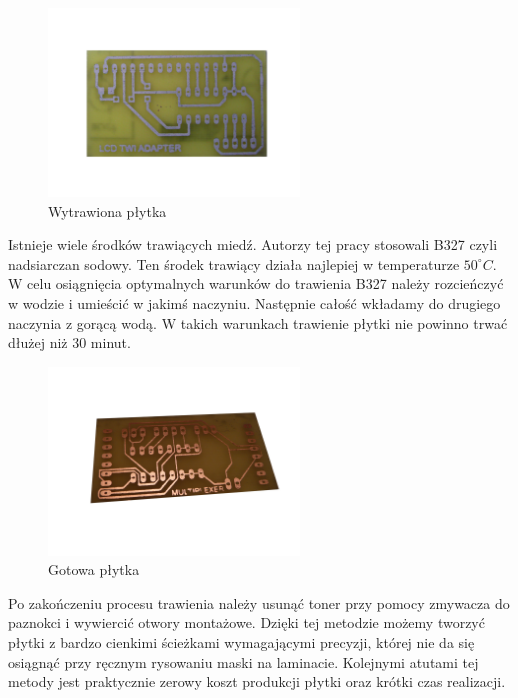 \begin{figure}[!ht]
 \centering
 \includegraphics[height=50mm]{../images/appendix/wytrawiona.JPG}
 \caption{Wytrawiona płytka}
 \label{fig:WytrawionaPlytka}
\end{figure}

Istnieje wiele środków trawiących miedź. Autorzy tej pracy stosowali B327 czyli nadsiarczan sodowy. Ten środek trawiący działa najlepiej w temperaturze $50^{\circ}C$. W celu osiągnięcia optymalnych warunków do trawienia B327 należy rozcieńczyć w wodzie i umieścić w jakimś naczyniu. Następnie całość wkładamy do drugiego naczynia z gorącą wodą. W takich warunkach trawienie płytki nie powinno trwać dłużej niż 30 minut.

\begin{figure}[!ht]
 \centering
 \includegraphics[height=50mm]{../images/appendix/gotowa.JPG}
 \caption{Gotowa płytka}
 \label{fig:GotowaPlytka}
\end{figure}

Po zakończeniu procesu trawienia należy usunąć toner przy pomocy zmywacza do paznokci i wywiercić otwory montażowe. Dzięki tej metodzie możemy tworzyć płytki z bardzo cienkimi ścieżkami wymagającymi precyzji, której nie da się osiągnąć przy ręcznym rysowaniu maski na laminacie. Kolejnymi atutami tej metody jest praktycznie zerowy koszt produkcji płytki oraz krótki czas realizacji.
